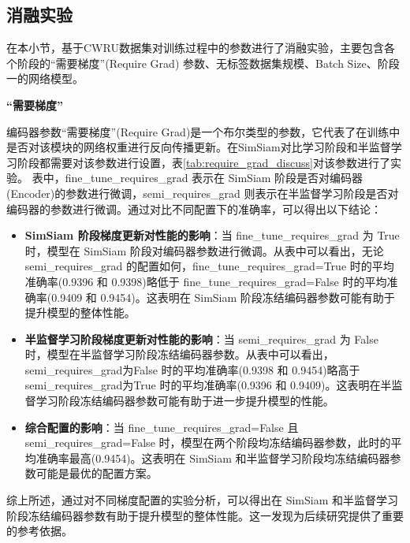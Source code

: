 \documentclass[master]{thesis-uestc}
\begin{document}
\subsection{消融实验}
在本小节，基于CWRU数据集对训练过程中的参数进行了消融实验，主要包含各个阶段的“需要梯度”(Require Grad) 参数、无标签数据集规模、Batch Size、阶段一的网络模型。

\textbf{“需要梯度”}

编码器参数“需要梯度”(Require Grad)是一个布尔类型的参数，它代表了在训练中是否对该模块的网络权重进行反向传播更新。在SimSiam对比学习阶段和半监督学习阶段都需要对该参数进行设置，表\ref{tab:require_grad_discuss}对该参数进行了实验。
表中，fine\_tune\_requires\_grad 表示在 SimSiam 阶段是否对编码器(Encoder)的参数进行微调，semi\_requires\_grad 则表示在半监督学习阶段是否对编码器的参数进行微调。通过对比不同配置下的准确率，可以得出以下结论：

\begin{itemize}
    \item \textbf{SimSiam 阶段梯度更新对性能的影响}：当 fine\_tune\_requires\_grad 为 True 时，模型在 SimSiam 阶段对编码器参数进行微调。从表中可以看出，无论 semi\_requires\_grad 的配置如何，fine\_tune\_requires\_grad=True 时的平均准确率(0.9396 和 0.9398)略低于 fine\_tune\_requires\_grad=False 时的平均准确率(0.9409 和 0.9454)。这表明在 SimSiam 阶段冻结编码器参数可能有助于提升模型的整体性能。

    \item \textbf{半监督学习阶段梯度更新对性能的影响}：当 semi\_requires\_grad 为 False 时，模型在半监督学习阶段冻结编码器参数。从表中可以看出，semi\_requires\_grad为False 时的平均准确率(0.9398 和 0.9454)略高于 semi\_requires\_grad为True 时的平均准确率(0.9396 和 0.9409)。这表明在半监督学习阶段冻结编码器参数可能有助于进一步提升模型的性能。

    \item \textbf{综合配置的影响}：当 fine\_tune\_requires\_grad=False 且 semi\_requires\_grad=False 时，模型在两个阶段均冻结编码器参数，此时的平均准确率最高(0.9454)。这表明在 SimSiam 和半监督学习阶段均冻结编码器参数可能是最优的配置方案。
\end{itemize}

综上所述，通过对不同梯度配置的实验分析，可以得出在 SimSiam 和半监督学习阶段冻结编码器参数有助于提升模型的整体性能。这一发现为后续研究提供了重要的参考依据。
\end{document}
